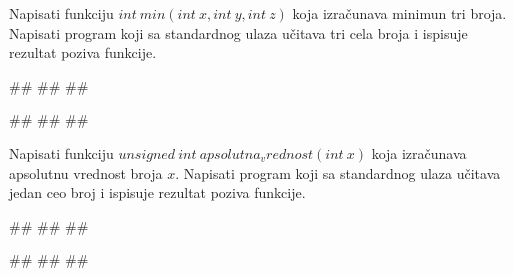\begin{Exercise}[label=p1.4_] 
Napisati funkciju $int\ min(int\ x, int\ y, int\ z)$ koja izračunava minimun tri broja. Napisati program koji sa standardnog ulaza učitava tri cela broja i ispisuje rezultat poziva funkcije. \\
\begin{miditest}
\begin{upotreba}{1}
#\naslovInt#
##
##
\end{upotreba}
\end{miditest}
\begin{miditest}
\begin{upotreba}{2}
#\naslovInt#
##
##
\end{upotreba}
\end{miditest}
\end{Exercise}
\begin{Answer}[ref=p1.4_]
\end{Answer}

\begin{Exercise}[label=p1.4_] 
Napisati funkciju $unsigned\ int\ apsolutna_vrednost(int\ x)$ koja izračunava apsolutnu vrednost broja $x$. Napisati program koji sa standardnog ulaza učitava jedan ceo broj i ispisuje rezultat poziva funkcije.  \\
\begin{miditest}
\begin{upotreba}{1}
#\naslovInt#
##
##
\end{upotreba}
\end{miditest}
\begin{miditest}
\begin{upotreba}{2}
#\naslovInt#
##
##
\end{upotreba}
\end{miditest}

\end{Exercise}
\begin{Answer}[ref=p1.4_]
\end{Answer}

